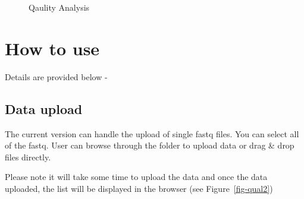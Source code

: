 \documentclass[
  a4paper,
  DIV=11,
  numbers=noendperiod,
  oneside,
  open=any]{scrreport}
\begin{document}
\begin{figure}[H]


\caption{\label{fig-qual1}Qaulity Analysis}

\end{figure}%

\section{How to use}\label{how-to-use-1}

Details are provided below -

\subsection{Data upload}\label{data-upload}

The current version can handle the upload of single fastq files. You can
select all of the fastq. User can browse through the folder to upload
data or drag \& drop files directly.

\begin{tcolorbox}[enhanced jigsaw, coltitle=black, colback=white, title=\textcolor{quarto-callout-note-color}{\faInfo}\hspace{0.5em}{Note}, leftrule=.75mm, titlerule=0mm, colframe=quarto-callout-note-color-frame, toprule=.15mm, opacityback=0, arc=.35mm, breakable, rightrule=.15mm, colbacktitle=quarto-callout-note-color!10!white, bottomtitle=1mm, opacitybacktitle=0.6, left=2mm, bottomrule=.15mm, toptitle=1mm]

Please note it will take some time to upload the data and once the data
uploaded, the list will be displayed in the browser (see
Figure~\ref{fig-qual2})

\end{tcolorbox}
\end{document}
